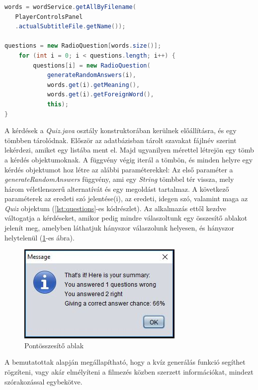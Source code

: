 \begin{lstlisting}[caption=Kérdések előállítása, language=java, label={lst:questions}]
words = wordService.getAllByFilename(
   PlayerControlsPanel
   .actualSubtitleFile.getName());

questions = new RadioQuestion[words.size()];
    for (int i = 0; i < questions.length; i++) {
        questions[i] = new RadioQuestion(
            generateRandomAnswers(i),
            words.get(i).getMeaning(),
            words.get(i).getForeignWord(),
            this);
}
\end{lstlisting}

 A kérdések a \textit{Quiz.java} osztály konstruktorában kerülnek előállításra, és egy tömbben tárolódnak. Először az adatbázisban tárolt szavakat fájlnév szerint lekérdezi, amiket egy listába ment el. Majd ugyanilyen mérettel létrejön egy tömb a kérdés objektumoknak. A függvény végig iterál a tömbön, és minden helyre egy kérdés objektumot hoz létre az alábbi paraméterekkel: Az első paraméter a \textit{generateRandomAnswers} függvény, ami egy \textit{String} tömbbel tér vissza, mely három véletlenszerű alternatívát és egy megoldást tartalmaz. A következő paraméterek az eredeti szó jelentése(i), az eredeti, idegen szó, valamint maga az \textit{Quiz} objektum (\ref{lst:questions}-es kódrészlet). Az alkalmazás ettől kezdve váltogatja a kérdéseket, amikor pedig mindre válaszoltunk egy összesítő ablakot jelenít meg, amelyben láthatjuk hányszor válaszolunk helyesen, és hányszor helytelenül (\ref{fig:summary}-es ábra).
 
\begin{figure}
\centering
  \includegraphics[width=.5\linewidth]{images/summary.jpg}
  \caption{Pontösszesítő ablak}
  \label{fig:summary}
\end{figure}

A bemutatottak alapján megállapítható, hogy a kvíz generálás funkció segíthet rögzíteni, vagy akár elmélyíteni a filmezés közben szerzett információkat, mindezt szórakozással egybekötve.
